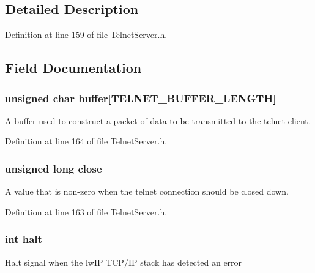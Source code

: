 \subsection{Detailed Description}


Definition at line 159 of file Telnet\-Server.\-h.



\subsection{Field Documentation}
\hypertarget{struct_telnet_server__t_a2153306d0b7676b5fbe604eb2d5d8dd9}{
\subsubsection[{buffer}]{\setlength{\rightskip}{0pt plus 5cm}unsigned char buffer\mbox{[}{\bf T\-E\-L\-N\-E\-T\-\_\-\-B\-U\-F\-F\-E\-R\-\_\-\-L\-E\-N\-G\-T\-H}\mbox{]}}}\label{struct_telnet_server__t_a2153306d0b7676b5fbe604eb2d5d8dd9}
A buffer used to construct a packet of data to be transmitted to the telnet client. 

Definition at line 164 of file Telnet\-Server.\-h.

\hypertarget{struct_telnet_server__t_a65bcef02b557e4aa1e0f04cc2ae743b9}{
\subsubsection[{close}]{\setlength{\rightskip}{0pt plus 5cm}unsigned long close}}\label{struct_telnet_server__t_a65bcef02b557e4aa1e0f04cc2ae743b9}
A value that is non-\/zero when the telnet connection should be closed down. 

Definition at line 163 of file Telnet\-Server.\-h.

\hypertarget{struct_telnet_server__t_a9a80d626b495810428f2f14b4dae6ecb}{
\subsubsection[{halt}]{\setlength{\rightskip}{0pt plus 5cm}int halt}}\label{struct_telnet_server__t_a9a80d626b495810428f2f14b4dae6ecb}
Halt signal when the lw\-I\-P T\-C\-P/\-I\-P stack has detected an error 

